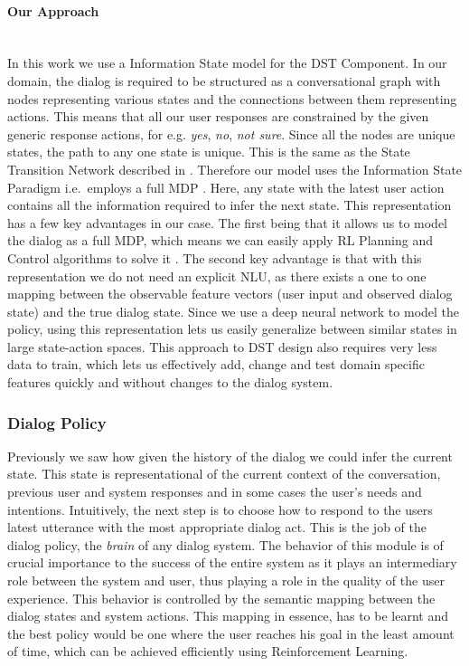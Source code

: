 \documentclass[14pt]{extarticle}
\newcommand{\myparagraph}[1]{\paragraph{#1}\mbox{}\\ \linebreak}
\numberwithin{equation}{section}
\begin{document}
	\myparagraph{Our Approach}	
	In this work we use a Information State model for the DST Component. In our domain,  the dialog is required to be structured as a conversational graph with nodes representing various states and the connections between them representing actions. This means that all our user responses are constrained by the given generic response actions,  for e.g. \textit{yes}, \textit{no}, \textit{not sure}. Since all the nodes are unique states, the path to any one state is unique. This is the same as the State Transition Network described in \cite{Sutton-introRL}. Therefore our model uses the Information State Paradigm i.e.\ employs a full MDP \cite{Larsson:2000:ISD:973935.973943}. Here, any state with the latest user action contains all the information required to infer the next state. This representation has a few key advantages in our case. The first being that it allows us to model the dialog as a full MDP, which means we can easily apply RL Planning and Control algorithms to solve it \cite{Sutton-introRL}.  The second key advantage is that with this representation we do not need an explicit NLU, as there exists a one to one mapping between the observable feature vectors (user input and observed dialog state) and the true dialog state. Since we use a deep neural network to model the policy, using this representation lets us easily generalize between similar states in large state-action spaces. This approach to DST design also requires very less data to train, which lets us effectively add, change and test domain specific features quickly and without changes to the dialog system.
	\subsubsection{Dialog Policy} 
	Previously we saw how given the history of the dialog we could infer the current state. This state is representational of the current context of the conversation, previous user and system responses and in some cases the user's needs and intentions. Intuitively, the next step is to choose how to respond to the users latest utterance with the most appropriate dialog act. This is the job of the dialog policy, the \textit{brain} of any dialog system. The behavior of this module is of crucial importance to the success of the entire system as it plays an intermediary role between the system and user, thus playing a role in the quality of the user experience. This behavior is controlled by the semantic mapping between the dialog states and system actions. This mapping in essence, has to be learnt and the best policy would be one where the user reaches his goal in the least amount of time, which can be achieved efficiently using Reinforcement Learning. 
	
\end{document}
